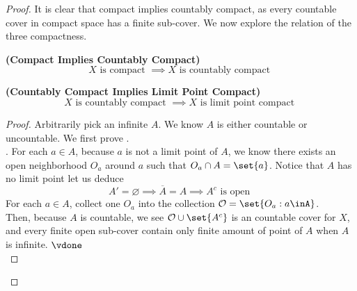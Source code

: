 \documentclass{report}
\begin{document}
\begin{proof}
{\begin{minipage}{39em}
It is clear that compact implies countably compact, as every countable cover in compact space has a finite sub-cover. We now explore the relation of the three compactness.
\end{minipage}}
\begin{theorem}
\label{2.6.6}
\textbf{(Compact Implies Countably Compact)} 
\begin{equation*}
 X\text{ is compact }\implies X\text{ is countably compact }
\end{equation*}
\end{theorem}
\begin{theorem}
\label{2.6.7}
\textbf{(Countably Compact Implies Limit Point Compact)} 
\begin{equation*}
X\text{ is countably compact }\implies X\text{ is limit point compact }
\end{equation*}
\end{theorem}
\begin{proof}
Arbitrarily pick an infinite $A$. We know  $A$ is either countable or uncountable. We first prove  .\\

. For each $a\in A$, because $a$ is not a limit point of $A$, we know there exists an open neighborhood  $O_a$ around $a$ such that  $O_a\cap A=\set{a}$. Notice that $A$ has no limit point let us deduce
\begin{equation*}
A'=\varnothing \implies \overline{A}=A\implies A^c\text{ is open }
\end{equation*}
For each $a\in A$, collect one $O_a$ into the collection $\mathcal{O}=\set{O_a:a\inA}$.\\

Then, because $A$ is countable, we see $\mathcal{O}\cup \set{A^c}$ is an countable cover for $X$, and every finite open sub-cover contain only finite amount of point of $A$ when  $A$ is infinite. \CaC $\vdone$\\


\end{proof}
\end{proof}
\end{document}
